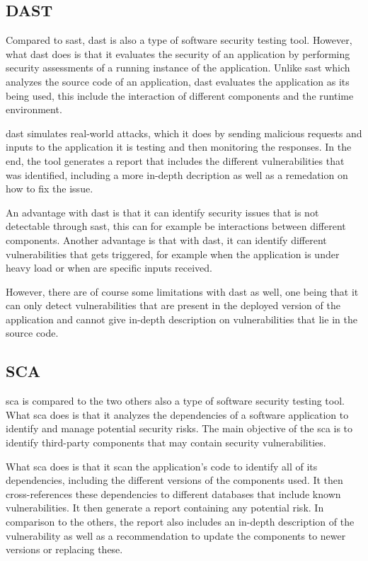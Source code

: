 \subsection{DAST}
Compared to \acrlong{sast}, \acrlong{dast} is also a type of software security testing tool. However, what \acrshort{dast} does is that it evaluates the security of an application by performing security assessments of a running instance of the application. Unlike \acrshort{sast} which analyzes the source code of an application, \acrshort{dast} evaluates the application as its being used, this include the interaction of different components and the runtime environment. 

\acrshort{dast} simulates real-world attacks, which it does by sending malicious requests and inputs to the application it is testing and then monitoring the responses. In the end, the tool generates a report that includes the different vulnerabilities that was identified, including a more in-depth decription as well as a remedation on how to fix the issue. \cite{dast}

An advantage with \acrshort{dast} is that it can identify security issues that is not detectable through \acrshort{sast}, this can for example be interactions between different components. Another advantage is that with \acrshort{dast}, it can identify different vulnerabilities that gets triggered, for example when the application is under heavy load or when are specific inputs received.

However, there are of course some limitations with \acrshort{dast} as well, one being that it can only detect vulnerabilities that are present in the deployed version of the application and cannot give in-depth description on vulnerabilities that lie in the source code.

\subsection{SCA}
\acrlong{sca} is compared to the two others also a type of software security testing tool. What \acrshort{sca} does is that it analyzes the dependencies of a software application to identify and manage potential security risks. The main objective of the \acrshort{sca} is to identify third-party components that may contain security vulnerabilities. \cite{sca}

What \acrshort{sca} does is that it scan the application's code to identify all of its dependencies, including the different versions of the components used. It then cross-references these dependencies to different databases that include known vulnerabilities. It then generate a report containing any potential risk. In comparison to the others, the report also includes an in-depth description of the vulnerability as well as a recommendation to update the components to newer versions or replacing these. 

